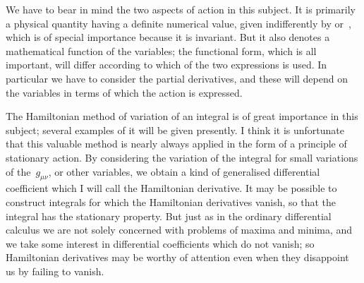 \documentclass[12pt]{book}
\begin{document}
We have to bear in mind the two aspects of action in this subject. It is
primarily a physical quantity having a definite numerical value, given indifferently
by  or~, which is of special importance because it is
invariant. But it also denotes a mathematical function of the variables; the
functional form, which is all important, will differ according to which of the
two expressions is used. In particular we have to consider the partial derivatives,
and these will depend on the variables in terms of which the action is
expressed.

The Hamiltonian method of variation of an integral is of great importance
in this subject; several examples of it will be given presently. I think it is
unfortunate that this valuable method is nearly always applied in the form of
a principle of stationary action. By considering the variation of the integral
for small variations of the~$g_{\mu\nu}$, or other variables, we obtain a kind of generalised
differential coefficient which I will call the Hamiltonian derivative. It
may be possible to construct integrals for which the Hamiltonian derivatives
vanish, so that the integral has the stationary property. But just as in the
ordinary differential calculus we are not solely concerned with problems of
maxima and minima, and we take some interest in differential coefficients
which do not vanish; so Hamiltonian derivatives may be worthy of attention
even when they disappoint us by failing to vanish.
\end{document}
